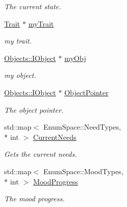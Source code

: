 \begin{DoxyCompactItemize}
\begin{DoxyCompactList}\small\item\em The current state. \end{DoxyCompactList}\item 
\hypertarget{class_n_p_c_a4425a1bed44cba46cbfb4c5242b3781f}{\hyperlink{class_trait}{Trait} $\ast$ \hyperlink{class_n_p_c_a4425a1bed44cba46cbfb4c5242b3781f}{my\-Trait}}\label{class_n_p_c_a4425a1bed44cba46cbfb4c5242b3781f}

\begin{DoxyCompactList}\small\item\em my trait. \end{DoxyCompactList}\item 
\hypertarget{class_n_p_c_af73bcc764619d81248b70441f26d3c52}{\hyperlink{class_objects_1_1_i_object}{Objects\-::\-I\-Object} $\ast$ \hyperlink{class_n_p_c_af73bcc764619d81248b70441f26d3c52}{my\-Obj}}\label{class_n_p_c_af73bcc764619d81248b70441f26d3c52}

\begin{DoxyCompactList}\small\item\em my object. \end{DoxyCompactList}\item 
\hypertarget{class_n_p_c_a562d859408ecbdcbb17f6d7fd8d59aa1}{\hyperlink{class_objects_1_1_i_object}{Objects\-::\-I\-Object} $\ast$ \hyperlink{class_n_p_c_a562d859408ecbdcbb17f6d7fd8d59aa1}{Object\-Pointer}}\label{class_n_p_c_a562d859408ecbdcbb17f6d7fd8d59aa1}

\begin{DoxyCompactList}\small\item\em The object pointer. \end{DoxyCompactList}\item 
std\-::map$<$ Enum\-Space\-::\-Need\-Types, \\*
int $>$ \hyperlink{class_n_p_c_a7521486609aac06982e95eebc0c57f6e}{Current\-Needs}
\begin{DoxyCompactList}\small\item\em Gets the current needs. \end{DoxyCompactList}\item 
\hypertarget{class_n_p_c_a5e6a93343caa98732e9c5ca4d5dc09f3}{std\-::map$<$ Enum\-Space\-::\-Mood\-Types, \\*
int $>$ \hyperlink{class_n_p_c_a5e6a93343caa98732e9c5ca4d5dc09f3}{Mood\-Progress}}\label{class_n_p_c_a5e6a93343caa98732e9c5ca4d5dc09f3}

\begin{DoxyCompactList}\small\item\em The mood progress. \end{DoxyCompactList}\end{DoxyCompactItemize}


